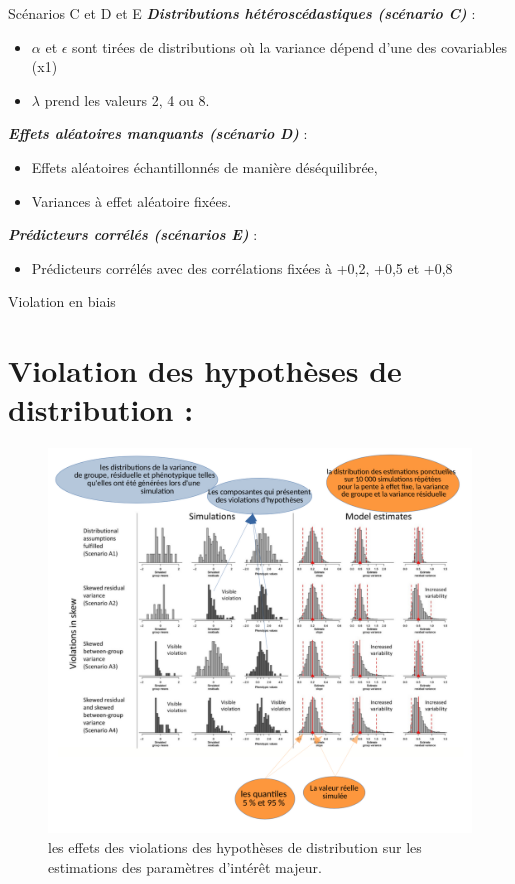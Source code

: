 \documentclass[unknownkeysallowed]{beamer}
\begin{document}


\begin{frame}{Scénarios C et D et E}
 \textbf{\textit{Distributions hétéroscédastiques (scénario C)}} :
 \begin{itemize}
 
        \item  $\alpha$ et $\epsilon$  sont tirées de distributions où la variance dépend d'une des covariables (x1)
    	\item  $\lambda$  prend les valeurs 2, 4 ou 8.
    \end{itemize}
 \textbf{\textit{Effets aléatoires manquants	 (scénario D)}} :
 \begin{itemize}
 
        \item  Effets  aléatoires échantillonnés de manière déséquilibrée,
  				\item  Variances à effet aléatoire fixées.
  \end{itemize}
   \textbf{\textit{Prédicteurs corrélés	 (scénarios E)}} :
 \begin{itemize}
 
        \item  Prédicteurs corrélés avec des corrélations fixées à +0,2, +0,5 et +0,8

  \end{itemize}
\end{frame}



\begin{frame}{Violation en biais}
\section{Violation des hypothèses de distribution :}
\begin{figure}
\includegraphics[scale=0.28]{11.png}
\caption{les effets des violations des hypothèses de distribution sur les estimations des paramètres d'intérêt majeur.}
\end{figure}
\end{frame}
\end{document}
